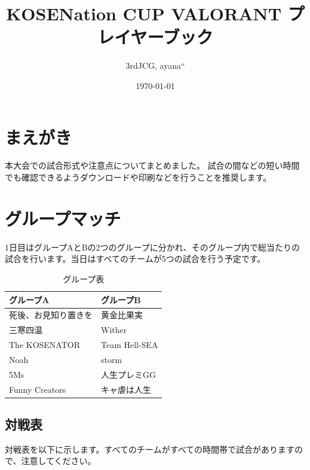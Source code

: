 \documentclass[uplatex,dvipdfmx]{jsarticle}
\title{KOSENation CUP VALORANT プレイヤーブック}
\author{\hfill 3rdJCG, ayana``}
\date{\today}
\begin{document}
\maketitle

\section{まえがき}
	本大会での試合形式や注意点についてまとめました。
	試合の間などの短い時間でも確認できるようダウンロードや印刷などを行うことを推奨します。

\section{グループマッチ}
	1日目はグループAとBの2つのグループに分かれ、そのグループ内で総当たりの試合を行います。当日はすべてのチームが5つの試合を行う予定です。

	\begin{table}[htbp]
	    \centering
	    \caption{グループ表}
	    \begin{tabular}{p{}|p{}}
	        \hline
	        {\bf グループA}       & {\bf グループB}  \\ \hline
	        死後、お見知り置きを  & 黄金比果実       \\ \hline
	        三寒四温              & Wither           \\ \hline
	        The KOSENATOR         & Team Hell-SEA    \\ \hline
	        Noah                  & storm            \\ \hline
	        5Ms                   & 人生プレミGG     \\ \hline
	        Funny Creators        & キャ虐は人生     \\ \hline
	    \end{tabular}
	\end{table}


	\subsection{対戦表}
	    対戦表を以下に示します。すべてのチームがすべての時間帯で試合がありますので、注意してください。
\end{document}
